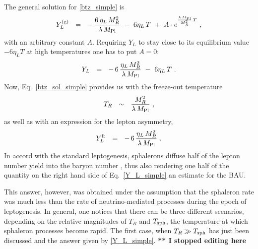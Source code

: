 \documentclass[12pt]{revtex4}
\newcommand{\Mpl}{M_{\rm Pl}}
\newcommand{\Tsph}{T_{\rm sph}}
\begin{document}
	The general solution for \eqref{btz_simple} is
\[
	Y_L^{(\rm g)} ~~=~~ -\,\frac{6\,\eta_L\,M_R^2}{\lambda\,\Mpl}
		~-~ 6\eta_L\,T ~+~
		A\cdot e^{\frac{\lambda\, \Mpl}{M_R^2}\, T}~,
\]
	with an arbitrary constant $ A $.
	Requiring $ Y_L $ to stay close to its equilibrium value 
	$ - 6\eta_L T $ at high temperatures one has to 
	put $ A = 0 $:
\begin{equation}
\label{btz_sol_simple}
	Y_L ~~=~~ -\,6\,\frac{\eta_L\,M_R^2}{\lambda\,\Mpl}
		~-~ 6\eta_L\,T ~.
\end{equation}
	Now, Eq.~\eqref{btz_sol_simple} provides us with the freeze-out
	temperature
\begin{equation}
\label{T_R}
	T_R ~~\sim~~ \frac{M_R^2}{\lambda\,\Mpl}~,
\end{equation}
	as well as with an expression for the lepton asymmetry,
\begin{equation}
\label{Y_L_simple}
	Y_L^{\rm fr} ~~=~~ -\, 6\,\frac{\eta_L\,M_R^2}{\lambda\,\Mpl}~.
\end{equation}
	In accord with the standard leptogenesis, sphalerons diffuse
	half of the lepton number yield into the baryon number
\cite{Kuzmin:1985mm}, 
	thus also rendering one half of the quantity on the right hand side
	of Eq.~\eqref{Y_L_simple} an estimate for the BAU.
	
	This answer, however, was obtained under the assumption that
	the sphaleron rate was much less than the rate of 
	neutrino-mediated processes during the epoch of leptogenesis.
	In general, one notices that  there can be three different scenarios, 
	depending on the relative magnitudes of $ T_R $ and $ \Tsph $, the 
	temperature at which sphaleron processes become rapid.
	The first case, when $ T_R \gg \Tsph $ has just been discussed
	and the answer given by \eqref{Y_L_simple}.
	{\bf *** I stopped editing here}
\end{document}
